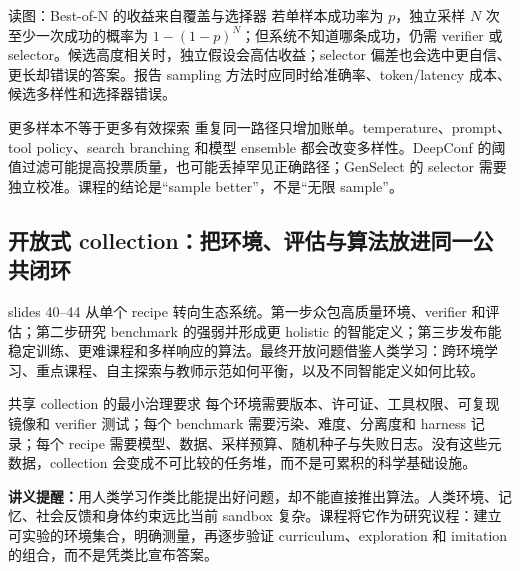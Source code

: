 
\begin{knowledgebox}{读图：Best-of-N 的收益来自覆盖与选择器}
若单样本成功率为 $p$，独立采样 $N$ 次至少一次成功的概率为 $1-(1-p)^N$；但系统不知道哪条成功，仍需 verifier 或 selector。候选高度相关时，独立假设会高估收益；selector 偏差也会选中更自信、更长却错误的答案。报告 sampling 方法时应同时给准确率、token/latency 成本、候选多样性和选择器错误。
\end{knowledgebox}

\begin{warningbox}{更多样本不等于更多有效探索}
重复同一路径只增加账单。temperature、prompt、tool policy、search branching 和模型 ensemble 都会改变多样性。DeepConf 的阈值过滤可能提高投票质量，也可能丢掉罕见正确路径；GenSelect 的 selector 需要独立校准。课程的结论是“sample better”，不是“无限 sample”。
\end{warningbox}

\subsection{开放式 collection：把环境、评估与算法放进同一公共闭环}

slides 40--44 从单个 recipe 转向生态系统。第一步众包高质量环境、verifier 和评估；第二步研究 benchmark 的强弱并形成更 holistic 的智能定义；第三步发布能稳定训练、更难课程和多样响应的算法。最终开放问题借鉴人类学习：跨环境学习、重点课程、自主探索与教师示范如何平衡，以及不同智能定义如何比较。


\begin{importantbox}{共享 collection 的最小治理要求}
每个环境需要版本、许可证、工具权限、可复现镜像和 verifier 测试；每个 benchmark 需要污染、难度、分离度和 harness 记录；每个 recipe 需要模型、数据、采样预算、随机种子与失败日志。没有这些元数据，collection 会变成不可比较的任务堆，而不是可累积的科学基础设施。
\end{importantbox}

\textbf{讲义提醒：}用人类学习作类比能提出好问题，却不能直接推出算法。人类环境、记忆、社会反馈和身体约束远比当前 sandbox 复杂。课程将它作为研究议程：建立可实验的环境集合，明确测量，再逐步验证 curriculum、exploration 和 imitation 的组合，而不是凭类比宣布答案。


